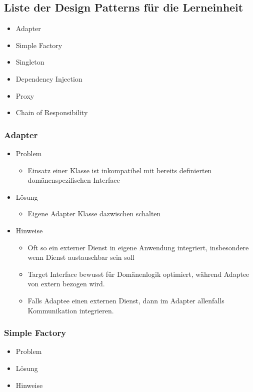 \documentclass[../ZF_SWEN1.tex]{subfiles}
\begin{document}
\subsection{Liste der Design Patterns für die Lerneinheit}
\begin{itemize}
	\item Adapter
	\item Simple Factory 
	\item Singleton
	\item Dependency Injection
	\item Proxy 
	\item Chain of Responsibility
\end{itemize}

\subsubsection{Adapter}

\begin{itemize}
	\item Problem
	\begin{itemize}
		\item Einsatz einer Klasse ist inkompatibel mit bereits definierten domänenspezifischen Interface
	\end{itemize}
	\item Lösung
	\begin{itemize}
		\item Eigene Adapter Klasse dazwischen schalten
	\end{itemize}
	\item Hinweise
	\begin{itemize}
		\item Oft so ein externer Dienst in eigene Anwendung integriert, insbesondere wenn Dienst austauschbar sein soll
		\item Target Interface bewusst für Domänenlogik optimiert, während Adaptee von extern bezogen wird.
		\item Falls Adaptee einen externen Dienst, dann im Adapter allenfalls Kommunikation integrieren.
	\end{itemize}
\end{itemize}


\subsubsection{Simple Factory}
\begin{itemize}
	\item Problem
	\item Lösung
	\item Hinweise
\end{itemize}
\end{document}
